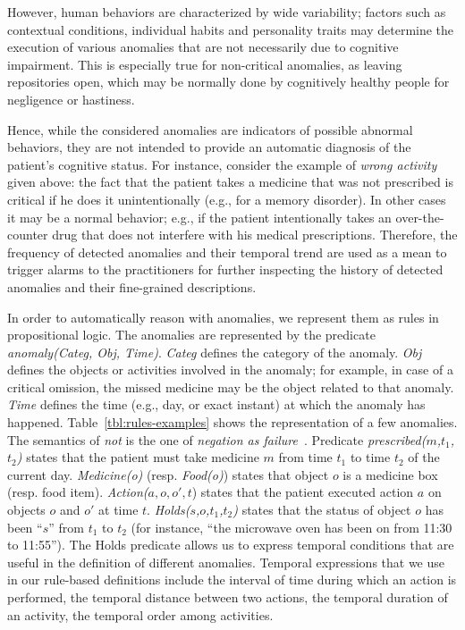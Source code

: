 \documentclass[10pt, conference, compsocconf]{IEEEtran}
\begin{document}
However, human behaviors are characterized by wide variability; factors such as contextual 
conditions, individual habits and personality traits may determine the execution of 
various anomalies that are not necessarily due to cognitive impairment. This is especially true 
for non-critical anomalies, as leaving repositories open, which may be normally done 
by cognitively healthy people for negligence or hastiness. 

Hence, while the considered anomalies are indicators of possible abnormal behaviors, 
they are not intended to provide an automatic diagnosis of the patient's cognitive status. 
For instance, consider the example of \emph{wrong activity} given above: the fact that
the patient takes a medicine that was not prescribed is critical if he does it
unintentionally (e.g., for a memory disorder). In other cases it may be a normal 
behavior; e.g., if the patient intentionally takes an over-the-counter drug that does 
not interfere with his medical prescriptions. 
Therefore, the frequency of detected anomalies and their temporal trend are 
used as a mean to trigger alarms to the practitioners for further inspecting
the history of detected anomalies and their fine-grained descriptions. 

In order to automatically reason with anomalies, we represent them as rules in propositional logic. 
The anomalies are represented by the predicate \emph{anomaly(Categ, Obj, Time)}. 
\emph{Categ} defines the category of the anomaly.
\emph{Obj} defines the objects or activities involved in the anomaly; for example, in case of a critical omission, the missed medicine may be the object related to that anomaly. \emph{Time} defines the time (e.g., day, or exact instant) at which the anomaly has happened. 
Table~\ref{tbl:rules-examples} shows the representation of a few anomalies. 
The semantics of \emph{not} is the one of \emph{negation as failure}~\cite{russell}.
Predicate \emph{prescribed($m$,$t_1$,$t_2$)} states that the patient must take medicine 
$m$ from time $t_1$ to time $t_2$ of the current day.
\emph{Medicine(o)} (resp. \emph{Food(o)}) states that object $o$ is a medicine box (resp. 
food item). \emph{Action($a,o,o',t$}) states that the
patient executed action $a$ on objects $o$ and $o'$ at time $t$. 
\emph{Holds($s$,$o$,$t_1$,$t_2$)} states that the status of object $o$ has been ``$s$'' 
from $t_1$ to $t_2$ (for instance, ``the microwave oven has been on from 11:30 to 11:55'').
The Holds predicate allows us to express temporal conditions that are useful in the 
definition of different anomalies. Temporal expressions that we use in our rule-based 
definitions include the interval of time during which an action is performed, the temporal 
distance between two actions, the temporal duration of an activity, the temporal order
among activities.
\end{document}
